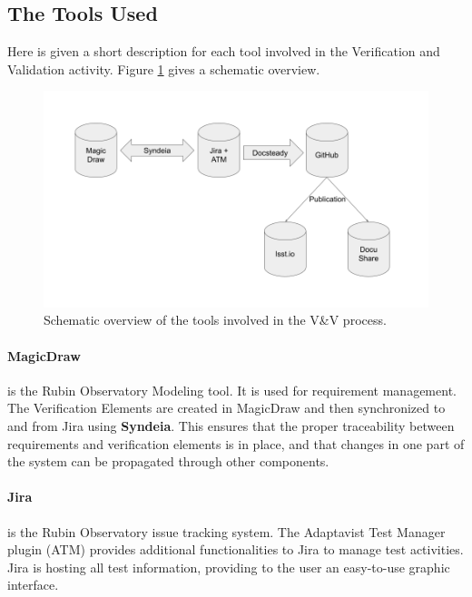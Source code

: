 \subsection{The Tools Used}

Here is given a short description for each tool involved in the Verification and Validation activity.
Figure \ref{fig:vandvtools} gives a schematic overview.

\begin{figure}
\begin{center}
\includegraphics[width=\textwidth]{imgs/VandVtools.png}
 \caption{Schematic overview of the tools involved in the V\&V process.}
 \label{fig:vandvtools}
\end{center}
\end{figure}

\paragraph{MagicDraw}
is the Rubin Observatory Modeling tool. It is used for requirement management. The Verification Elements are created
in MagicDraw and then synchronized to and from Jira using \textbf{Syndeia}. This ensures that the proper 
traceability between requirements and verification elements is in place, and that changes in one part of the system can be propagated through other components.

\paragraph{Jira}
is the Rubin Observatory issue tracking system.
The Adaptavist Test Manager plugin (ATM) provides additional functionalities to Jira to manage test activities.
Jira is hosting all test information, providing to the user an easy-to-use graphic interface.

